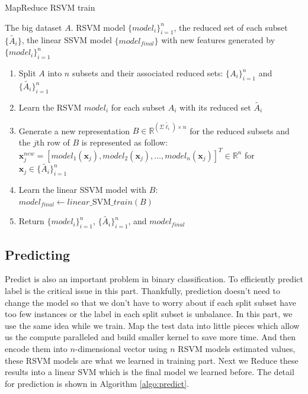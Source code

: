 \documentclass[conference]{IEEEtran}
\begin{document}
\begin{algorithm}
\begin{algorithmic}
\caption{MapReduce RSVM train}
\label{algo:train}
\REQUIRE The big dataset $A$.
\ENSURE RSVM model $\{model_i\}^n_{i=1}$, the reduced set of each subset $\{\tilde{A_i}\}$, the linear SSVM model $\{model_{final}\}$ with new features generated by $\{model_i\}^n_{i=1}$
\begin{enumerate}
  \item Split $A$ into $n$ subsets and their associated reduced sets: $\{A_i\}^n_{i=1}$ and $\{\tilde{A_i}\}^n_{i=1}$
  \item Learn the RSVM $model_i$ for each subset $A_i$ with its reduced set $\tilde{A_i}$
  \item Generate a new representation $B\in\mathbb{R}^{(\Sigma\tilde{\ell_i})\times n}$ for the reduced subsets and the $j$th row of $B$ is represented as follow:\\
  $\mathbf{x}^{new}_j=[model_1(\mathbf{x}_j),model_2(\mathbf{x}_j),\dots,model_n(\mathbf{x}_j)]^T\in \mathbb{R}^n$ for $\mathbf{x}_j \in \{\tilde{A_i}\}^n_{i=1}$
  \item Learn the linear SSVM model with $B$:\\
  $model_{final} \gets linear\_$SVM$\_train(B)$
  \item Return $\{model_i\}^n_{i=1}$, $\{\tilde{A_i}\}^n_{i=1}$, and $model_{final}$
\end{enumerate}
\end{algorithmic}
\end{algorithm}

\subsection{Predicting}
Predict is also an important problem in binary classification. To efficiently predict label is the critical issue in this part. Thankfully, prediction doesn't need to change the model so that we don't have to worry about if each split subset have too few instances or the label in each split subset is unbalance. In this part, we use the same idea while we train. Map the test data into little pieces which allow us the compute paralleled and build smaller kernel to save more time. And then encode them into $n$-dimensional vector using $n$ RSVM models estimated values, these RSVM models are what we learned in training part. Next we Reduce these results into a linear SVM which is the final model we learned before. The detail for prediction is shown in Algorithm \ref{algo:predict}.
\end{document}
